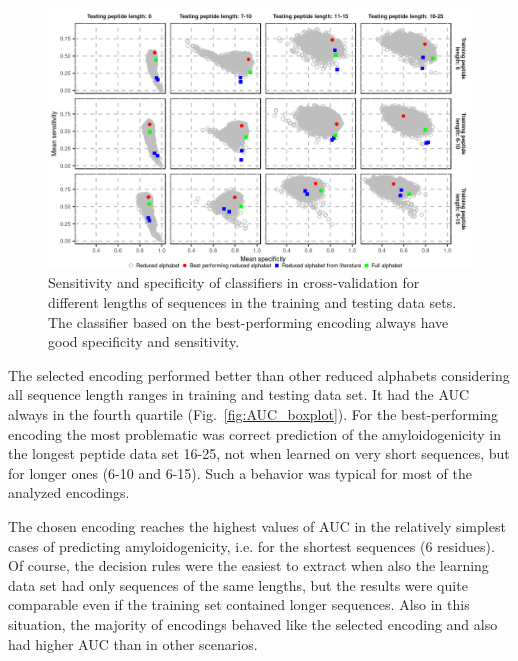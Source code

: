 \documentclass[a4,center,fleqn]{NAR}
\begin{document}
\begin{figure}[!tpb]
\centerline{\includegraphics{figures/sesp_plot.png}}
\caption{Sensitivity and specificity of classifiers in cross-validation for 
different lengths of sequences in the training and testing data sets.
The classifier based on the best-performing encoding always have 
good specificity and sensitivity.}\label{fig:sesp_plot}
\end{figure}

The selected encoding performed better than other reduced alphabets considering 
all sequence length ranges in training and testing data set. It had the AUC 
%
%
%
always in the fourth quartile (Fig.~\ref{fig:AUC_boxplot}). For the 
best-performing encoding the most problematic was correct prediction of the 
amyloidogenicity in the longest peptide data set 16-25, not when learned on very 
short sequences, but for longer ones (6-10 and 6-15). Such a behavior was 
typical for most of the analyzed encodings.

  The chosen encoding reaches the highest values of AUC in the relatively 
simplest cases of predicting amyloidogenicity, i.e. for the shortest sequences (6 
%
%
%
residues). Of course, the decision rules were the easiest to extract when also 
the learning data set had only sequences of the same lengths, but the results 
were quite comparable even if the training set contained longer sequences. Also 
in this situation, the majority of encodings behaved like the 
selected encoding and also had higher AUC than in other scenarios.
%
%
%
\end{document}
